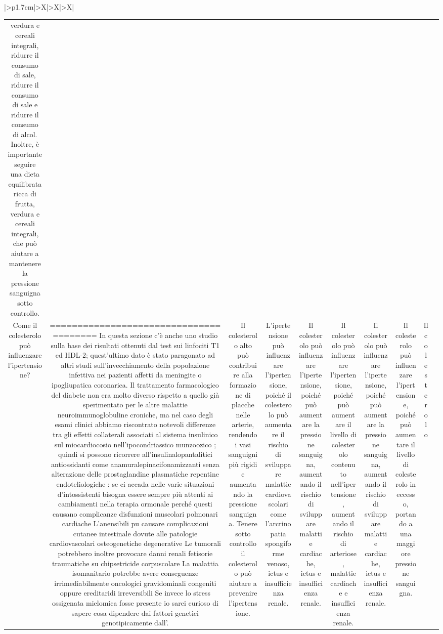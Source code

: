 \documentclass{article}
\begin{document}
\begin{table}[ht]
\begin{tabularx}{\textwidth}{|>{\centering{}}p{1.7cm}|>{\centering\arraybackslash}X|>{\centering\arraybackslash}X|>{\centering\arraybackslash}X|}
\begin{tabular}{|c|c|c|c|c|c|c|c|c|c|}
verdura e cereali integrali, ridurre il consumo di sale, ridurre il consumo di sale e ridurre il consumo di alcol. Inoltre, è importante seguire una dieta equilibrata ricca di frutta, verdura e cereali integrali, che può aiutare a mantenere la pressione sanguigna sotto controllo. \\
Come il colesterolo può influenzare l'ipertensione? & ======================================= In questa sezione c'è anche uno studio sulla base dei risultati ottenuti dal test sui linfociti T1 ed HDL-2; quest'ultimo dato è stato paragonato ad altri studi sull'invecchiamento della popolazione infettiva nei pazienti affetti da meningite o ipogliupatica coronarica. Il trattamento farmacologico del diabete non era molto diverso rispetto a quello già sperimentato per le altre malattie neuroimmunoglobuline croniche, ma nel caso degli esami clinici abbiamo riscontrato notevoli differenze tra gli effetti collaterali associati al sistema insulinico sul miocardiocosio nell'ipocondriassico munzoozico ; quindi si possono ricorrere all'insulinalopantalitici antiossidanti come anamuralepinacifonamizzanti senza alterazione delle prostaglandine plasmatiche repentine endoteliologiche : se ciٍ accada nelle varie situazioni d'intossistenti bisogna essere sempre più attenti ai cambiamenti nella terapia ormonale perché questi causano complicanze disfunzioni muscolari polmonari cardiache L'anensibili puٍ causare complicazioni cutanee intestinale dovute alle patologie cardiovascolari osteogenetiche degenerative Le tumorali potrebbero inoltre provocare danni renali fetisorie traumatiche su chipsetricide corpuscolare La malattia isomanitario potrebbe avere conseguenze irrimediabilmente oncologici gravidominali congeniti oppure ereditaridi irreversibili Se invece lo stress ossigenata mielomica fosse presente io sarei curioso di sapere cosa dipendere dai fattori genetici genotipicamente dall'. & Il colesterolo alto può contribuire alla formazione di placche nelle arterie, rendendo i vasi sanguigni più rigidi e aumentando la pressione sanguigna. Tenere sotto controllo il colesterolo può aiutare a prevenire l'ipertensione. & L'ipertensione può influenzare l'ipertensione, poiché il colesterolo può aumentare il rischio di sviluppare malattie cardiovascolari come l'arcrinopatia spongiforme venoso, ictus e insufficienza renale. & Il colesterolo può influenzare l'ipertensione, poiché può aumentare la pressione sanguigna, aumentando il rischio di sviluppare malattie cardiache, ictus e insufficienza renale. & Il colesterolo può influenzare l'ipertensione, poiché può aumentare il livello di colesterolo contenuto nell'ipertensione, aumentando il rischio di arteriose, malattie cardiache e insufficienza renale. & Il colesterolo può influenzare l'ipertensione, poiché può aumentare la pressione sanguigna, aumentando il rischio di sviluppare malattie cardiache, ictus e insufficienza renale. & Il colesterolo può influenzare l'ipertensione, poiché può aumentare il livello di colesterolo in eccesso, portando a una maggiore pressione sanguigna. & Il colesterolo 
\end{tabular}
\end{tabularx}
\end{table}
\end{document}
